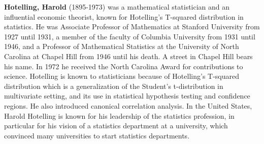 \textbf{Hotelling, Harold} (1895-1973) was a mathematical statistician and an influential economic theorist, known for Hotelling's T-squared distribution in statistics. He was Associate Professor of Mathematics at Stanford University from 1927 until 1931, a member of the faculty of Columbia University from 1931 until 1946, and a Professor of Mathematical Statistics at the University of North Carolina at Chapel Hill from 1946 until his death. A street in Chapel Hill bears his name. In 1972 he received the North Carolina Award for contributions to science. Hotelling is known to statisticians because of Hotelling's T-squared distribution which is a generalization of the Student's t-distribution in multivariate setting, and its use in statistical hypothesis testing and confidence regions. He also introduced canonical correlation analysis. In the United States, Harold Hotelling is known for his leadership of the statistics profession, in particular for his vision of a statistics department at a university, which convinced many universities to start statistics departments.

